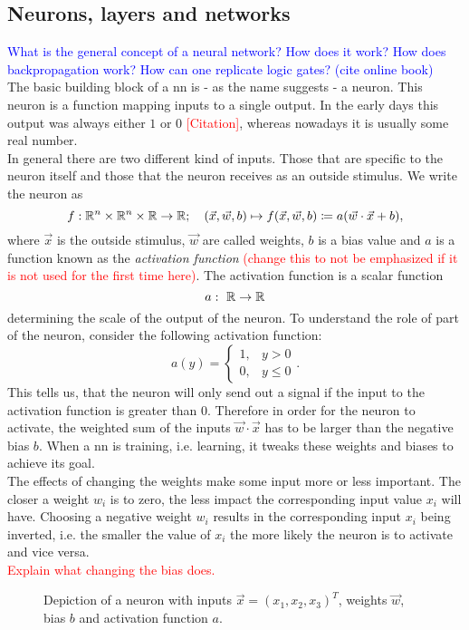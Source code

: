 \subsection{Neurons, layers and networks}
\textcolor{blue}{What is the general concept of a neural network? How does it work? How does backpropagation work? How can one replicate logic gates? (cite online book)}\\
\noindent The basic building block of a \gls{nn} is - as the name suggests - a neuron. This neuron is a function mapping inputs to a single output. In the early days this output was always either $1$ or $0$ \textcolor{red}{[Citation]}, whereas nowadays it is usually some real number.\\
In general there are two different kind of inputs. Those that are specific to the neuron itself and those that the neuron receives as an outside stimulus. We write the neuron as
\begin{equation}\label{def:neuron}
f: \mathbb{R}^n\times\mathbb{R}^n\times\mathbb{R}\to\mathbb{R} ;\ \ \ (\vec{x}, \vec{w}, b)\mapsto f(\vec{x}, \vec{w}, b)\coloneqq a(\vec{w}\cdot\vec{x}+b),
\end{equation}
where $\vec{x}$ is the outside stimulus, $\vec{w}$ are called weights, $b$ is a bias value and $a$ is a function known as the \emph{activation function}\textcolor{red}{ (change this to not be emphasized if it is not used for the first time here)}. The activation function is a scalar function
\begin{equation}\label{def:activation_function}
a:\ \mathbb{R}\to\mathbb{R}
\end{equation}
determining the scale of the output of the neuron. To understand the role of part of the neuron, consider the following activation function:
\begin{equation}\label{def:step_activation}
a(y) = 
\begin{cases}
	1,& y> 0\\
	0,& y\leq 0
\end{cases}.
\end{equation}
This tells us, that the neuron will only send out a signal if the input to the activation function is greater than 0. Therefore in order for the neuron to activate, the weighted sum of the inputs $\vec{w}\cdot\vec{x}$ has to be larger than the negative bias $b$. When a \gls{nn} is training, i.e. learning, it tweaks these weights and biases to achieve its goal.\\
The effects of changing the weights make some input more or less important. The closer a weight $w_i$ is to zero, the less impact the corresponding input value $x_i$ will have. Choosing a negative weight $w_i$ results in the corresponding input $x_i$ being inverted, i.e. the smaller the value of $x_i$ the more likely the neuron is to activate and vice versa.\\
\textcolor{red}{Explain what changing the bias does.}
\begin{figure}
\centering

\caption{Depiction of a neuron with inputs $\vec{x}={(x_1, x_2, x_3)}^T$, weights $\vec{w}$, bias $b$ and activation function $a$.}\label{fig:neuron}
\end{figure}

